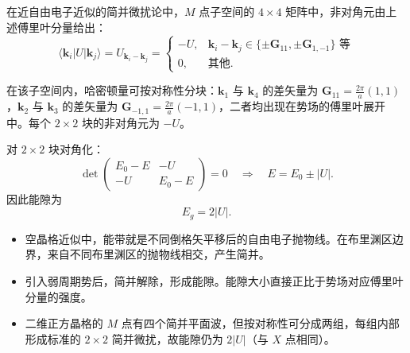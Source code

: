 \begin{derivationbox}[标准解题过程]
在近自由电子近似的简并微扰论中，$M$ 点子空间的 $4\times4$ 矩阵中，非对角元由上述傅里叶分量给出：
\begin{equation}
\langle\bm{k}_i|U|\bm{k}_j\rangle=U_{\bm{k}_i-\bm{k}_j}=\begin{cases}
-U, & \bm{k}_i-\bm{k}_j\in\{\pm\bm{G}_{11},\pm\bm{G}_{1,-1}\}\text{ 等}\\
0, & \text{其他}.
\end{cases}
\end{equation}

在该子空间内，哈密顿量可按对称性分块：$\bm{k}_1$ 与 $\bm{k}_4$ 的差矢量为 $\bm{G}_{11}=\frac{2\pi}{a}(1,1)$，$\bm{k}_2$ 与 $\bm{k}_3$ 的差矢量为 $\bm{G}_{-1,1}=\frac{2\pi}{a}(-1,1)$，二者均出现在势场的傅里叶展开中。每个 $2\times2$ 块的非对角元为 $-U$。

对 $2\times2$ 块对角化：
\begin{equation}
\det\begin{pmatrix}
E_0-E & -U\\
-U & E_0-E
\end{pmatrix}=0
\quad\Rightarrow\quad E=E_0\pm|U|.
\end{equation}
因此能隙为
\begin{equation}
\boxed{E_g=2|U|.}
\end{equation}
\end{derivationbox}

\begin{insightbox}[物理图像]
\begin{itemize}
    \item 空晶格近似中，能带就是不同倒格矢平移后的自由电子抛物线。在布里渊区边界，来自不同布里渊区的抛物线相交，产生简并。
    \item 引入弱周期势后，简并解除，形成能隙。能隙大小直接正比于势场对应傅里叶分量的强度。
    \item 二维正方晶格的 $M$ 点有四个简并平面波，但按对称性可分成两组，每组内部形成标准的 $2\times2$ 简并微扰，故能隙仍为 $2|U|$（与 $X$ 点相同）。
\end{itemize}
\end{insightbox}
